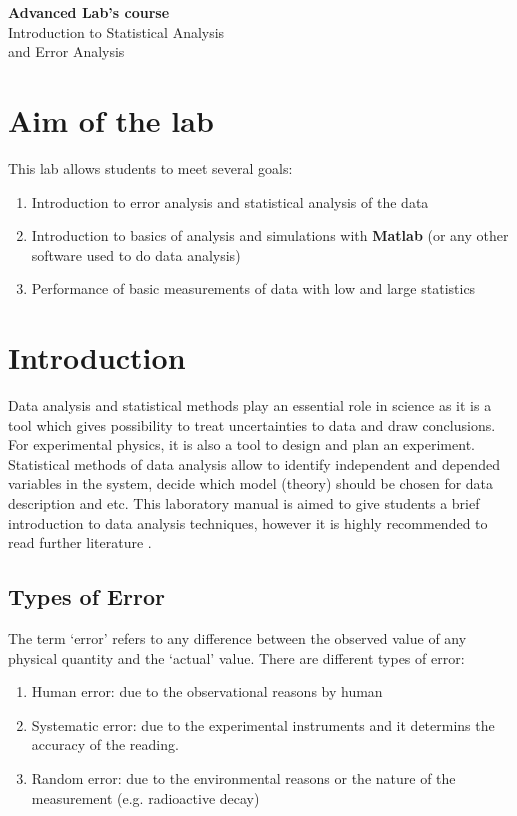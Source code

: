 \documentclass[12pt,a4paper]{report}
\begin{document}
\begin{center}
{\bf Advanced Lab's course} \\ %
Introduction to Statistical Analysis \\
and Error Analysis \\
\end{center}


\section{Aim of the lab}
This lab allows students to meet several goals:
\begin{enumerate}
\item Introduction to error analysis and statistical analysis of the data
\item Introduction to basics of analysis and simulations with \textbf{Matlab} (or any other software used to do data analysis)
\item Performance of basic measurements of data with low and large statistics
\end{enumerate}


\section{Introduction}
Data analysis and statistical methods play an essential role in science as it is a tool which gives possibility to treat uncertainties to data and draw conclusions. For experimental physics, it is also a tool to design and plan an experiment. Statistical methods of data analysis allow to identify independent and depended variables in the system, decide which model (theory) should be chosen for data description and etc. This laboratory manual is aimed to give students a brief introduction to data analysis techniques, however it is highly recommended to read further literature \cite{stat_1, stat_2, stat_3}.

\subsection{Types of Error}
The term `error' refers to any difference between the observed value of any physical quantity and the `actual' value.
There are different types of error:
\begin{enumerate}
\item Human error: due to the observational reasons by human
\item Systematic error: due to the experimental instruments and it determins the accuracy of the reading.
\item Random error: due to the environmental reasons or the nature of the measurement (e.g. radioactive decay)
\end{enumerate}
\end{document}
